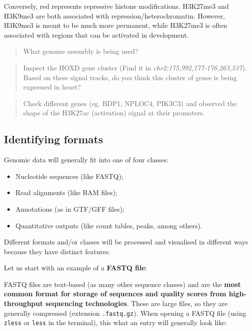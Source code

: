 \documentclass[
]{book}
\providecommand{\tightlist}{%
  \setlength{\itemsep}{0pt}\setlength{\parskip}{0pt}}
\begin{document}
Conversely, red represents repressive histone modifications. H3K27me3 and H3K9me3 are both associated with repression/heterochromatin. However, H3K9me3 is meant to be much more permanent, while H3K27me3 is often associated with regions that can be activated in development.

\begin{quote}
What genome assembly is being used?
\end{quote}

\begin{quote}
Inspect the HOXD gene cluster (Find it in \emph{chr2:175,992,177-176,263,537}). Based on these signal tracks, do you think this cluster of genes is being expressed in heart?
\end{quote}

\begin{quote}
Check different genes (eg. BDP1, NPLOC4, PIK3C3) and observed the shape of the H3K27ac (activation) signal at their promoters.
\end{quote}

\hypertarget{identifying-formats}{%
\subsection{Identifying formats}\label{identifying-formats}}

Genomic data will generally fit into one of four classes:

\begin{itemize}
\tightlist
\item
  Nucleotide sequences (like FASTQ);
\item
  Read alignments (like BAM files);
\item
  Annotations (as in GTF/GFF files);
\item
  Quantitative outputs (like count tables, peaks, among others).
\end{itemize}

Different formats and/or classes will be processed and visualised in different ways because they have distinct features.

Let us start with an example of a \textbf{FASTQ file}:

FASTQ files are text-based (as many other sequence classes) and are the \textbf{most common format for storage of sequences and quality scores from high-throughput sequencing technologies}. These are large files, so they are generally compressed (extension \texttt{.fastq.gz}). When opening a FASTQ file (using \texttt{zless} or \texttt{less} in the terminal), this what an entry will generally look like:
\end{document}
